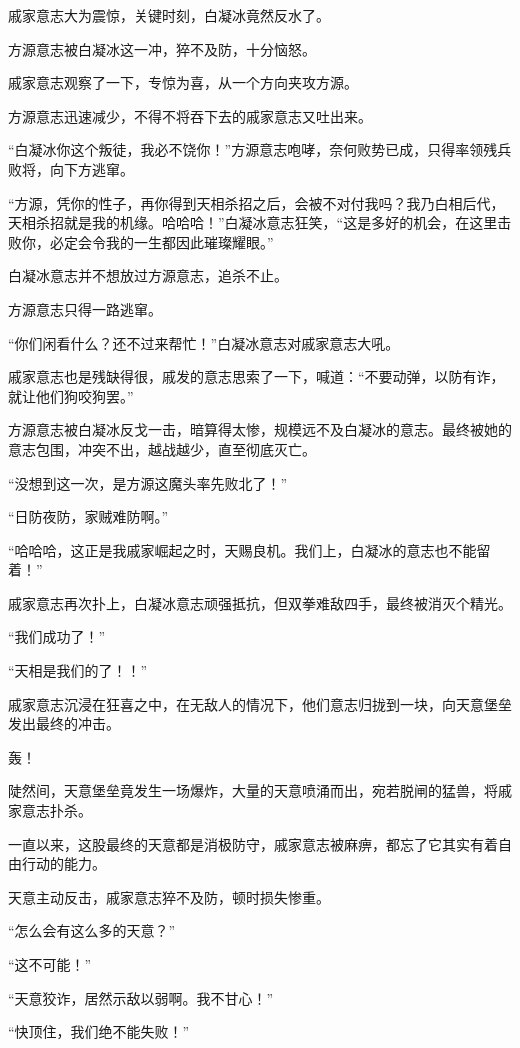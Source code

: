 \begin{this_body}
戚家意志大为震惊，关键时刻，白凝冰竟然反水了。

方源意志被白凝冰这一冲，猝不及防，十分恼怒。

戚家意志观察了一下，专惊为喜，从一个方向夹攻方源。

方源意志迅速减少，不得不将吞下去的戚家意志又吐出来。

“白凝冰你这个叛徒，我必不饶你！”方源意志咆哮，奈何败势已成，只得率领残兵败将，向下方逃窜。

“方源，凭你的性子，再你得到天相杀招之后，会被不对付我吗？我乃白相后代，天相杀招就是我的机缘。哈哈哈！”白凝冰意志狂笑，“这是多好的机会，在这里击败你，必定会令我的一生都因此璀璨耀眼。”

白凝冰意志并不想放过方源意志，追杀不止。

方源意志只得一路逃窜。

“你们闲看什么？还不过来帮忙！”白凝冰意志对戚家意志大吼。

戚家意志也是残缺得很，戚发的意志思索了一下，喊道：“不要动弹，以防有诈，就让他们狗咬狗罢。”

方源意志被白凝冰反戈一击，暗算得太惨，规模远不及白凝冰的意志。最终被她的意志包围，冲突不出，越战越少，直至彻底灭亡。

“没想到这一次，是方源这魔头率先败北了！”

“日防夜防，家贼难防啊。”

“哈哈哈，这正是我戚家崛起之时，天赐良机。我们上，白凝冰的意志也不能留着！”

戚家意志再次扑上，白凝冰意志顽强抵抗，但双拳难敌四手，最终被消灭个精光。

“我们成功了！”

“天相是我们的了！！”

戚家意志沉浸在狂喜之中，在无敌人的情况下，他们意志归拢到一块，向天意堡垒发出最终的冲击。

轰！

陡然间，天意堡垒竟发生一场爆炸，大量的天意喷涌而出，宛若脱闸的猛兽，将戚家意志扑杀。

一直以来，这股最终的天意都是消极防守，戚家意志被麻痹，都忘了它其实有着自由行动的能力。

天意主动反击，戚家意志猝不及防，顿时损失惨重。

“怎么会有这么多的天意？”

“这不可能！”

“天意狡诈，居然示敌以弱啊。我不甘心！”

“快顶住，我们绝不能失败！”


\end{this_body}
